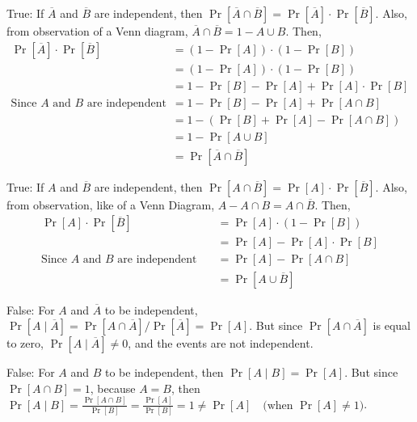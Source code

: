 \documentclass[11pt]{article}
\begin{document}
\begin{solution}

\begin{Parts}
    
\Part True: If $\overline{A}$ and $\overline{B}$ are independent, then 
$\Pr[\overline{A} \cap \overline{B}] = \Pr[\overline{A}] \cdot \Pr[\overline{B}]$.
Also, from observation of a Venn diagram, $\overline{A} \cap \overline{B} = 1 -
A \cup B$. Then, 
\[
    \begin{split}
        \Pr[\overline{A}] \cdot \Pr[\overline{B}] &= (1-\Pr[A]) \cdot (1-\Pr[B]) \\
        &= (1-\Pr[A]) \cdot (1-\Pr[B]) \\
        &= 1 - \Pr[B] - \Pr[A] + \Pr[A] \cdot \Pr[B] \\
        \text{Since $A$ and $B$ are independent} \quad &= 
        1 - \Pr[B] - \Pr[A] + \Pr[A \cap B] \\
        &= 1 - (\Pr[B] + \Pr[A] - \Pr[A \cap B]) \\ 
        &= 1 - \Pr[A \cup B] \\ 
        &= \Pr[\overline{A} \cap \overline{B}]
    \end{split}
\]

\Part True: If $A$ and $\overline{B}$ are independent, then 
$\Pr[A \cap \overline{B}] = \Pr[A] \cdot \Pr[\overline{B}]$. Also, from
observation, like of a Venn Diagram, $A - A \cap B = A \cap \overline{B}$. Then,
\[
    \begin{split}
        \Pr[A] \cdot \Pr[\overline{B}] &= \Pr[A] \cdot (1 - \Pr[B]) \\
        &= \Pr[A] - \Pr[A] \cdot \Pr[B] \\
        \text{Since $A$ and $B$ are independent} \quad
        &= \Pr[A] - \Pr[A \cap B] \\
        &= \Pr[A \cup \overline{B}]
    \end{split}
\]

\Part False: For $A$ and $\overline{A}$ to be independent, $\Pr[A \mid \overline{A}]
= \Pr[A \cap \overline{A}] / \Pr[\overline{A}] = \Pr[A]$. But since $\Pr[A \cap 
\overline{A}]$ is equal to zero, $\Pr[A \mid \overline{A}] \neq 0$, and the
events are not independent. 

\Part False: For $A$ and $B$ to be independent, then $\Pr[A \mid B] = 
\Pr[A]$. But since $\Pr[A \cap B] = 1$, because $A = B$,
then $\Pr[A \mid B] = \frac{\Pr[A \cap B]}{\Pr[B]} = \frac{\Pr[A]}{\Pr[B]} = 1
\neq \Pr[A] \quad \text{(when $\Pr[A] \neq 1$})$.

\end{Parts}

\end{solution}
\end{document}
